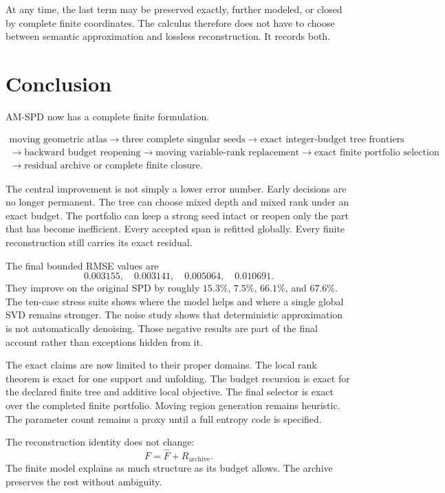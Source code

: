 \documentclass[11pt]{article}
\theoremstyle{definition}
\theoremstyle{remark}
\begin{document}
At any time, the last term may be preserved exactly, further modeled, or closed by complete finite coordinates. The calculus therefore does not have to choose between semantic approximation and lossless reconstruction. It records both.

\section{Conclusion}
AM-SPD now has a complete finite formulation.

\[
\boxed{
\begin{gathered}
\text{moving geometric atlas}
\longrightarrow
\text{three complete singular seeds}
\longrightarrow
\text{exact integer-budget tree frontiers}\\
\longrightarrow
\text{backward budget reopening}
\longrightarrow
\text{moving variable-rank replacement}
\longrightarrow
\text{exact finite portfolio selection}\\
\longrightarrow
\text{residual archive or complete finite closure}.
\end{gathered}
}
\]

The central improvement is not simply a lower error number. Early decisions are no longer permanent. The tree can choose mixed depth and mixed rank under an exact budget. The portfolio can keep a strong seed intact or reopen only the part that has become inefficient. Every accepted span is refitted globally. Every finite reconstruction still carries its exact residual.

The final bounded RMSE values are
\[
0.003155,\quad0.003141,\quad0.005064,\quad0.010691.
\]
They improve on the original SPD by roughly $15.3\%$, $7.5\%$, $66.1\%$, and $67.6\%$. The ten-case stress suite shows where the model helps and where a single global SVD remains stronger. The noise study shows that deterministic approximation is not automatically denoising. Those negative results are part of the final account rather than exceptions hidden from it.

The exact claims are now limited to their proper domains. The local rank theorem is exact for one support and unfolding. The budget recursion is exact for the declared finite tree and additive local objective. The final selector is exact over the completed finite portfolio. Moving region generation remains heuristic. The parameter count remains a proxy until a full entropy code is specified.

The reconstruction identity does not change:
\[
\boxed{F=\widehat F+R_{\mathrm{archive}}.}
\]
The finite model explains as much structure as its budget allows. The archive preserves the rest without ambiguity.
\end{document}
